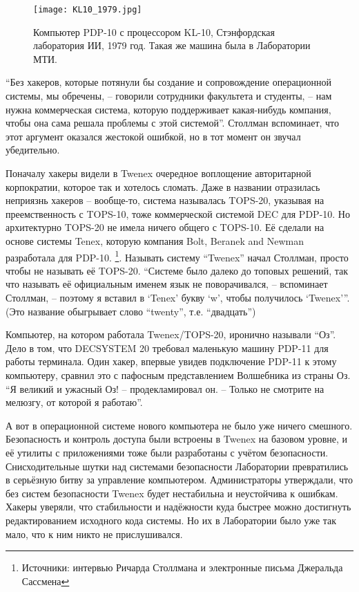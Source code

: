 \begin{figure}[ht] \centering
  \texttt{[image: KL10\_1979.jpg]}
  \caption{Компьютер PDP-10 с процессором KL-10, Стэнфордская лаборатория ИИ, 1979 год. Такая же машина была в Лаборатории МТИ.}
\end{figure}

\enquote{Без хакеров, которые потянули бы создание и сопровождение операционной системы, мы обречены, -- говорили сотрудники факультета и студенты, -- нам нужна коммерческая система, которую поддерживает какая-нибудь компания, чтобы она сама решала проблемы с этой системой}. Столлман вспоминает, что этот аргумент оказался жестокой ошибкой, но в тот момент он звучал убедительно.

Поначалу хакеры видели в Twenex очередное воплощение авторитарной корпократии, которое так и хотелось сломать. Даже в названии отразилась неприязнь хакеров -- вообще-то, система называлась TOPS-20, указывая на преемственность с TOPS-10, тоже коммерческой системой DEC для PDP-10. Но архитектурно TOPS-20 не имела ничего общего с TOPS-10. Её сделали на основе системы Tenex, которую компания Bolt, Beranek and Newman разработала для PDP-10. \footnote{Источники: интервью Ричарда Столлмана и электронные письма Джеральда Сассмена}. Называть систему \enquote{Twenex} начал Столлман, просто чтобы не называть её TOPS-20. \enquote{Системе было далеко до топовых решений, так что называть её официальным именем язык не поворачивался, -- вспоминает Столлман, -- поэтому я вставил в \enquote{Tenex} букву \enquote{w}, чтобы получилось \enquote{Twenex}}. (Это название обыгрывает слово \enquote{twenty}, т.е. \enquote{двадцать})

Компьютер, на котором работала Twenex/TOPS-20, иронично называли \enquote{Оз}. Дело в том, что DECSYSTEM 20 требовал маленькую машину PDP-11 для работы терминала. Один хакер, впервые увидев подключение PDP-11 к этому компьютеру, сравнил это с пафосным представлением Волшебника из страны Оз. \enquote{Я великий и ужасный Оз! -- продекламировал он. -- Только не смотрите на мелюзгу, от которой я работаю}.

А вот в операционной системе нового компьютера не было уже ничего смешного. Безопасность и контроль доступа были встроены в Twenex на базовом уровне, и её утилиты с приложениями тоже были разработаны с учётом безопасности. Снисходительные шутки над системами безопасности Лаборатории превратились в серьёзную битву за управление компьютером. Администраторы утверждали, что без систем безопасности Twenex будет нестабильна и неустойчива к ошибкам. Хакеры уверяли, что стабильности и надёжности куда быстрее можно достигнуть редактированием исходного кода системы. Но их в Лаборатории было уже так мало, что к ним никто не прислушивался.

